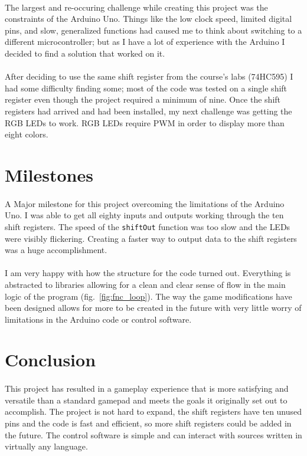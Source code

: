 \documentclass[12pt,a4paper]{article}
\begin{document}
\paragraph{}
The largest and re-occuring challenge while creating this project was the constraints of the Arduino Uno. Things like the low clock speed, limited digital pins, and slow, generalized functions had caused me to think about switching to a different microcontroller; but as I have a lot of experience with the Arduino I decided to find a solution that worked on it.
\paragraph{}
After deciding to use the same shift register from the course's labs (74HC595) I had some difficulty finding some; most of the code was tested on a single shift register even though the project required a minimum of nine. Once the shift registers had arrived and had been installed, my next challenge was getting the \gls{RGB} \glspl{LED} to work. \gls{RGB} \glspl{LED} require \gls{PWM} in order to display more than eight colors.
\section{Milestones}
\paragraph{}
A Major milestone for this project overcoming the limitations of the Arduino Uno. I was able to get all eighty inputs and outputs working through the ten shift registers. The speed of the \texttt{shiftOut} function was too slow and the \glspl{LED} were visibly flickering. Creating a faster way to output data to the shift registers was a huge accomplishment.
\paragraph{}
I am very happy with how the structure for the code turned out. Everything is abstracted to libraries allowing for a clean and clear sense of flow in the main logic of the program (fig.~\ref{fig:fnc_loop}). The way the game modifications have been designed allows for more to be created in the future with very little worry of limitations in the Arduino code or control software.
\section{Conclusion}
\paragraph{}
This project has resulted in a gameplay experience that is more satisfying and versatile than a standard gamepad and meets the goals it originally set out to accomplish. The project is not hard to expand, the shift registers have ten unused pins and the code is fast and efficient, so more shift registers could be added in the future. The control software is simple and can interact with sources written in virtually any language.
\end{document}
